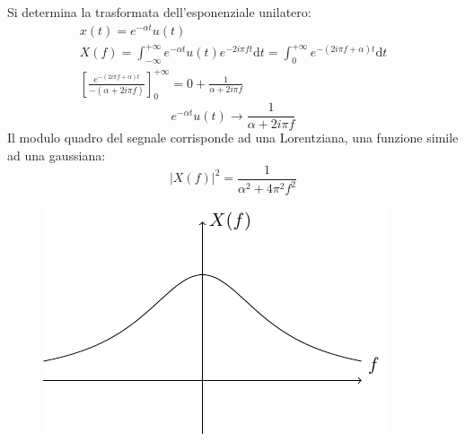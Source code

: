 \documentclass{article}
\newcommand{\df}{\mathrm{d}}
\numberwithin{equation}{subsection}
\begin{document}
Si determina la trasformata dell'esponenziale unilatero:
\begin{gather*}
    x(t)=e^{-\alpha t}u(t)\\
    X(f)=\displaystyle\int_{-\infty}^{+\infty}e^{-\alpha t}u(t)e^{-2i\pi ft}\df t=\int_0^{+\infty}e^{-(2i\pi f+\alpha)t}\df t\\
    \left[\displaystyle\frac{e^{-(2i\pi f+\alpha)t}}{-(\alpha+2i\pi f)}\right]^{+\infty}_0=0+\frac{1}{\alpha+2i\pi f}
\end{gather*}
\begin{equation}
    e^{-\alpha t}u(t)\to\frac{1}{\alpha+ 2i\pi f}
\end{equation}
Il modulo quadro del segnale corrisponde ad una Lorentziana, una funzione simile ad una gaussiana: 
\begin{equation*}
    \left|X(f)\right|^2=\frac{1}{\alpha^2+4\pi^2f^2}
\end{equation*}
\begin{figure}[H]%
    \centering
    \includegraphics{lorentziana.pdf}%
\end{figure}
\end{document}
